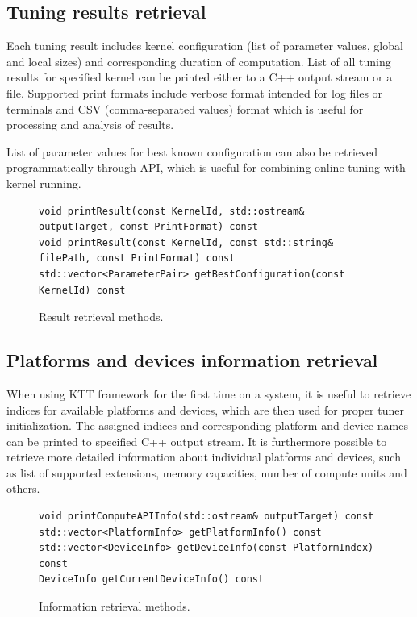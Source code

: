 \documentclass
[
    digital, %
    oneside, %
    table, %
    nolof, %
    nolot, %
    nocover %
]{fithesis3}
\begin{document}
\subsection{Tuning results retrieval}
Each tuning result includes kernel configuration (list of parameter values, global and local sizes) and corresponding duration of computation. List of
all tuning results for specified kernel can be printed either to a C++ output stream or a file. Supported print formats include verbose format intended
for log files or terminals and CSV (comma-separated values) format which is useful for processing and analysis of results.

List of parameter values for best known configuration can also be retrieved programmatically through API, which is useful for combining online tuning
with kernel running.

\begin{figure}
\begin{lstlisting}
void printResult(const KernelId, std::ostream& outputTarget, const PrintFormat) const
void printResult(const KernelId, const std::string& filePath, const PrintFormat) const
std::vector<ParameterPair> getBestConfiguration(const KernelId) const
\end{lstlisting}
\caption{Result retrieval methods.}
\label{ktt-result-methods}
\end{figure}

\subsection{Platforms and devices information retrieval}
When using KTT framework for the first time on a system, it is useful to retrieve indices for available platforms and devices, which are then used for
proper tuner initialization. The assigned indices and corresponding platform and device names can be printed to specified C++ output stream. It is
furthermore possible to retrieve more detailed information about individual platforms and devices, such as list of supported extensions, memory
capacities, number of compute units and others.

\begin{figure}
\begin{lstlisting}
void printComputeAPIInfo(std::ostream& outputTarget) const
std::vector<PlatformInfo> getPlatformInfo() const
std::vector<DeviceInfo> getDeviceInfo(const PlatformIndex) const
DeviceInfo getCurrentDeviceInfo() const
\end{lstlisting}
\caption{Information retrieval methods.}
\label{ktt-information-methods}
\end{figure}
\end{document}
